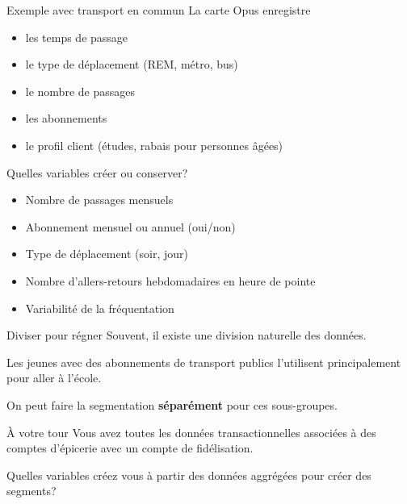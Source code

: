 \documentclass[
  ignorenonframetext,
]{beamer}
\providecommand{\tightlist}{%
  \setlength{\itemsep}{0pt}\setlength{\parskip}{0pt}}\usepackage{longtable,booktabs,array}
\begin{document}
\begin{frame}{Exemple avec transport en commun}
\protect\hypertarget{exemple-avec-transport-en-commun}{}
La carte Opus enregistre

\begin{itemize}
\tightlist
\item
  les temps de passage
\item
  le type de déplacement (REM, métro, bus)
\item
  le nombre de passages
\item
  les abonnements
\item
  le profil client (études, rabais pour personnes âgées)
\end{itemize}
\end{frame}

\begin{frame}{Quelles variables créer ou conserver?}
\protect\hypertarget{quelles-variables-cruxe9er-ou-conserver}{}
\begin{itemize}
\tightlist
\item
  Nombre de passages mensuels
\item
  Abonnement mensuel ou annuel (oui/non)
\item
  Type de déplacement (soir, jour)
\item
  Nombre d'allers-retours hebdomadaires en heure de pointe
\item
  Variabilité de la fréquentation
\end{itemize}
\end{frame}

\begin{frame}{Diviser pour régner}
\protect\hypertarget{diviser-pour-ruxe9gner}{}
Souvent, il existe une division naturelle des données.

Les jeunes avec des abonnements de transport publics l'utilisent
principalement pour aller à l'école.

On peut faire la segmentation \textbf{séparément} pour ces sous-groupes.
\end{frame}

\begin{frame}{À votre tour}
\protect\hypertarget{uxe0-votre-tour}{}
Vous avez toutes les données transactionnelles associées à des comptes
d'épicerie avec un compte de fidélisation.

Quelles variables créez vous à partir des données aggrégées pour créer
des segments?
\end{frame}
\end{document}
